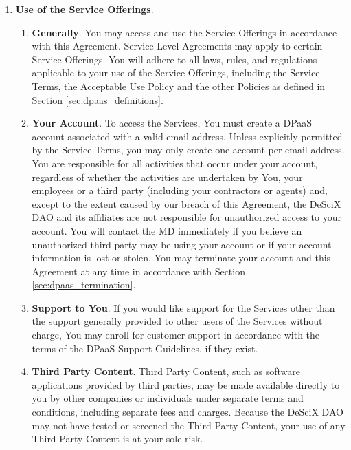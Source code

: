 \documentclass{article}
\begin{document}
\begin{enumerate}
    \item \textbf{Use of the Service Offerings}.

    \begin{enumerate}
        \item \textbf{Generally}. You may access and use the Service Offerings in accordance with this Agreement. Service Level Agreements may apply to certain Service Offerings. You will adhere to all laws, rules, and regulations applicable to your use of the Service Offerings, including the Service Terms, the Acceptable Use Policy and the other Policies as defined in Section \ref{sec:dpaas_definitions}.
        
        \item \textbf{Your Account}. To access the Services, You must create a DPaaS account associated with a valid email address. Unless explicitly permitted by the Service Terms, you may only create one account per email address. You are responsible for all activities that occur under your account, regardless of whether the activities are undertaken by You, your employees or a third party (including your contractors or agents) and, except to the extent caused by our breach of this Agreement, the DeSciX DAO and its affiliates are not responsible for unauthorized access to your account. You will contact the MD immediately if you believe an unauthorized third party may be using your account or if your account information is lost or stolen. You may terminate your account and this Agreement at any time in accordance with Section \ref{sec:dpaas_termination}.
        
        \item \textbf{Support to You}. If you would like support for the Services other than the support generally provided to other users of the Services without charge, You may enroll for customer support in accordance with the terms of the DPaaS Support Guidelines, if they exist.
        
        \item \textbf{Third Party Content}. Third Party Content, such as software applications provided by third parties, may be made available directly to you by other companies or individuals under separate terms and conditions, including separate fees and charges. Because the DeSciX DAO may not have tested or screened the Third Party Content, your use of any Third Party Content is at your sole risk.
    \end{enumerate}


\end{enumerate}
\end{document}

